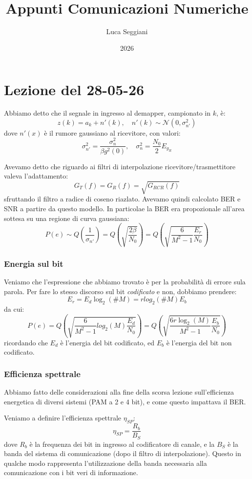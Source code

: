 \documentclass[a4paper,11pt]{article}
\title{Appunti Comunicazioni Numeriche}
\author{Luca Seggiani}
\date{2026}
\begin{document}
\section{Lezione del 28-05-26}

\thispagestyle{empty}
\pagestyle{fancy}

Abbiamo detto che il segnale in ingresso al demapper, campionato in $k$, è:
$$
z(k) = a_k + n'(k), \quad n'(k) \sim \mathcal{N} \left( 0, \sigma_{n'}^2 \right)
$$
dove $n'(x)$ è il rumore gaussiano al ricevitore, con valori:
$$
\sigma_{n'}^2 = \frac{\sigma_n^2}{\beta g^2(0)}, \quad \sigma_n^2 = \frac{N_0}{2} E_{g_R}
$$

Avevamo detto che riguardo ai filtri di interpolazione ricevitore/trasmettitore valeva l'adattamento:
$$
G_T(f) = G_R(f) = \sqrt{G_{RCR}(f)}
$$
sfruttando il filtro a radice di coseno riazlato. Avevamo quindi calcolato BER e SNR a partire da questo modello. In particolae la BER era propozionale all'area sottesa su una regione di curva gaussiana:
$$
P(e) \sim Q \left( \frac{1}{\sigma_{n'}} \right) = Q \left( \sqrt{\frac{2\beta}{N_0}} \right) = Q \left( \sqrt{\frac{6}{M^2 - 1}{\frac{E_r}{N_0}}} \right)
$$

\subsubsection{Energia sul bit}
Veniamo che l'espressione che abbiamo trovato è per la probabilità di errore sula parola. Per fare lo stesso discorso sul bit \textit{codificato} e non, dobbiamo prendere:
$$
E_r = E_d \log_2(\# M) = r log_2 (\# M) E_b
$$
da cui:
$$
P(e) = Q \left( \sqrt{ \frac{6}{M^2 - 1} log_2(  M) \frac{E_d}{N_0} } \right) = Q \left( \sqrt{ \frac{6 r \log_2(  M)}{M^2 - 1} \frac{E_b}{N_0}} \right)
$$
ricordando che $E_d$ è l'energia del bit codificato, ed $E_b$ è l'energia del bit non codificato.

\subsubsection{Efficienza spettrale}
Abbiamo fatto delle considerazioni alla fine della scorsa lezione sull'efficienza energetica di diversi sistemi (PAM a 2 e 4 bit), e come questo impattava il BER.

Veniamo a definire l'efficienza spettrale $\eta_{SP}$:
$$
\eta_{SP} = \frac{R_b}{B_S}
$$
dove $R_b$ è la frequenza dei bit in ingresso al codificatore di canale, e la $B_S$ è la banda del sistema di comunicazione (dopo il filtro di interpolazione). Questo in qualche modo rappresenta l'utilizzazione della banda necessaria alla comunicazione con i bit veri di informazione.
\end{document}
